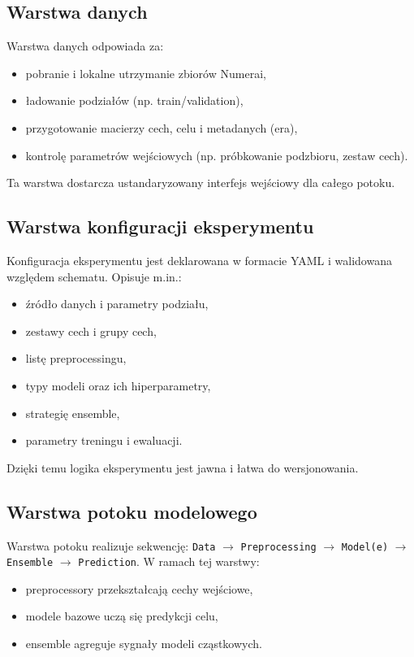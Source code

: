\documentclass[12pt,a4paper]{report}
\begin{document}
\subsection{Warstwa danych}
Warstwa danych odpowiada za:
\begin{itemize}\item pobranie i lokalne utrzymanie zbiorów Numerai,
\item ładowanie podziałów (np. train/validation),
\item przygotowanie macierzy cech, celu i metadanych (era),
\item kontrolę parametrów wejściowych (np. próbkowanie podzbioru, zestaw cech).\end{itemize}

Ta warstwa dostarcza ustandaryzowany interfejs wejściowy dla całego potoku.

\subsection{Warstwa konfiguracji eksperymentu}
Konfiguracja eksperymentu jest deklarowana w formacie YAML i walidowana względem schematu.
Opisuje m.in.:
\begin{itemize}\item źródło danych i parametry podziału,
\item zestawy cech i grupy cech,
\item listę preprocessingu,
\item typy modeli oraz ich hiperparametry,
\item strategię ensemble,
\item parametry treningu i ewaluacji.\end{itemize}

Dzięki temu logika eksperymentu jest jawna i łatwa do wersjonowania.

\subsection{Warstwa potoku modelowego}
Warstwa potoku realizuje sekwencję:
\noindent\texttt{Data} $\rightarrow$ \texttt{Preprocessing} $\rightarrow$
\texttt{Model(e)} $\rightarrow$ \texttt{Ensemble} $\rightarrow$ \texttt{Prediction}.
W ramach tej warstwy:
\begin{itemize}\item preprocessory przekształcają cechy wejściowe,
\item modele bazowe uczą się predykcji celu,
\item ensemble agreguje sygnały modeli cząstkowych.\end{itemize}
\end{document}
